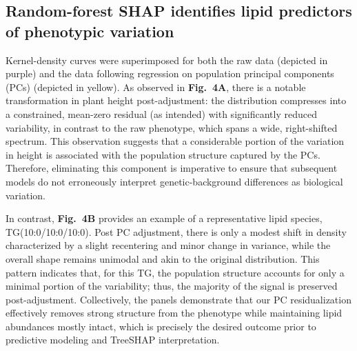 \documentclass[10pt,letterpaper]{article}
\begin{document}





\subsection*{Random-forest SHAP identifies lipid predictors of phenotypic variation}

Kernel-density curves were superimposed for both the raw data (depicted in purple) and the data following regression on population principal components (PCs) (depicted in yellow). As observed in \textbf{Fig.~4A}, there is a notable transformation in plant height post-adjustment: the distribution compresses into a constrained, mean-zero residual (as intended) with significantly reduced variability, in contrast to the raw phenotype, which spans a wide, right-shifted spectrum. This observation suggests that a considerable portion of the variation in height is associated with the population structure captured by the PCs. Therefore, eliminating this component is imperative to ensure that subsequent models do not erroneously interpret genetic-background differences as biological variation.

In contrast, \textbf{Fig.~4B} provides an example of a representative lipid species, TG(10:0/10:0/10:0). Post PC adjustment, there is only a modest shift in density characterized by a slight recentering and minor change in variance, while the overall shape remains unimodal and akin to the original distribution. This pattern indicates that, for this TG, the population structure accounts for only a minimal portion of the variability; thus, the majority of the signal is preserved post-adjustment. Collectively, the panels demonstrate that our PC residualization effectively removes strong structure from the phenotype while maintaining lipid abundances mostly intact, which is precisely the desired outcome prior to predictive modeling and TreeSHAP interpretation.
\end{document}
